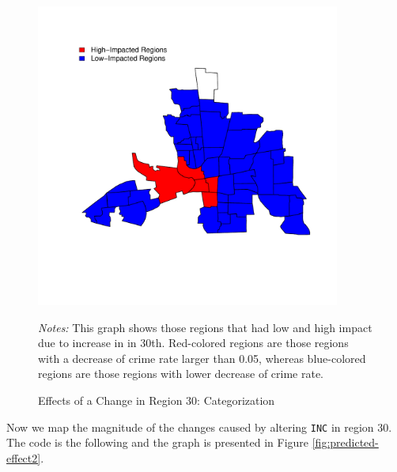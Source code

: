 \begin{figure}[ht]
  \caption{Effects of a Change in Region 30: Categorization}
    \label{fig:predicted-effect}
    \centering 
	\begin{minipage}{.9\linewidth}
\begin{knitrout}
\color{fgcolor}

{\centering \includegraphics[width=10cm,height=10cm]{figure/predicted-effect-1} 

}


\end{knitrout}
\footnotesize
		\emph{Notes:} This graph shows those regions that had low and high impact due to increase in  in 30th. Red-colored regions are those regions with a decrease of crime rate larger than 0.05, whereas blue-colored regions are those regions with lower decrease of crime rate. 
	\end{minipage}	
\end{figure}

Now we map the magnitude of the changes caused by altering \texttt{INC} in region 30. The code is the following and the graph is presented in Figure \ref{fig:predicted-effect2}.

\begin{knitrout}
\color{fgcolor}\begin{kframe}
\begin{alltt}
    \hlkwb{<-} \hlstd{(}\hlstd{,} \hlstd{)}
   \hlkwb{<-} \hlopt{$}  \hlstd{=} \hlstd{,}  \hlstd{=} \hlstd{)}
 \hlkwb{<-} 
  
\hlstd{(}\hlstd{,}  \hlstd{=} \hlopt{$} \hlstd{),}    \hlstd{=} \hlstd{)}
\end{alltt}
\end{kframe}
\end{knitrout}

